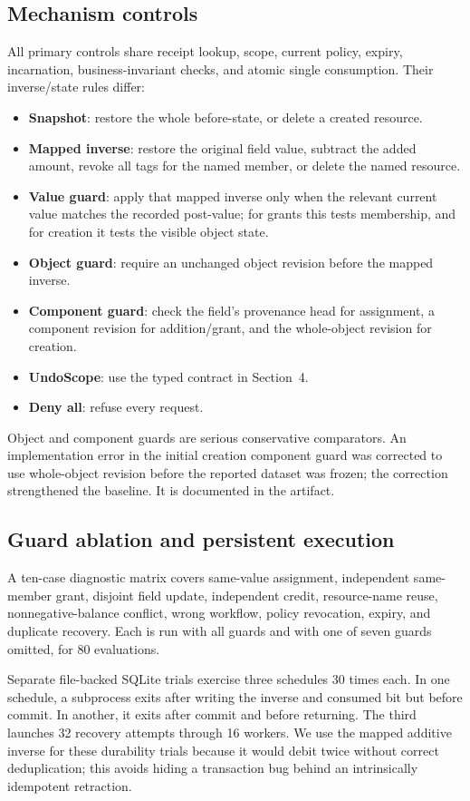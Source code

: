 \documentclass[10pt,twocolumn]{article}
\begin{document}
\subsection{Mechanism controls}
All primary controls share receipt lookup, scope, current policy, expiry, incarnation, business-invariant checks, and atomic single consumption. Their inverse/state rules differ:
\begin{itemize}
\item \textbf{Snapshot}: restore the whole before-state, or delete a created resource.
\item \textbf{Mapped inverse}: restore the original field value, subtract the added amount, revoke all tags for the named member, or delete the named resource.
\item \textbf{Value guard}: apply that mapped inverse only when the relevant current value matches the recorded post-value; for grants this tests membership, and for creation it tests the visible object state.
\item \textbf{Object guard}: require an unchanged object revision before the mapped inverse.
\item \textbf{Component guard}: check the field's provenance head for assignment, a component revision for addition/grant, and the whole-object revision for creation.
\item \textbf{UndoScope}: use the typed contract in Section~4.
\item \textbf{Deny all}: refuse every request.
\end{itemize}
Object and component guards are serious conservative comparators. An implementation error in the initial creation component guard was corrected to use whole-object revision before the reported dataset was frozen; the correction strengthened the baseline. It is documented in the artifact.

\subsection{Guard ablation and persistent execution}
A ten-case diagnostic matrix covers same-value assignment, independent same-member grant, disjoint field update, independent credit, resource-name reuse, nonnegative-balance conflict, wrong workflow, policy revocation, expiry, and duplicate recovery. Each is run with all guards and with one of seven guards omitted, for 80 evaluations.

Separate file-backed SQLite trials exercise three schedules 30 times each. In one schedule, a subprocess exits after writing the inverse and consumed bit but before commit. In another, it exits after commit and before returning. The third launches 32 recovery attempts through 16 workers. We use the mapped additive inverse for these durability trials because it would debit twice without correct deduplication; this avoids hiding a transaction bug behind an intrinsically idempotent retraction.
\end{document}
